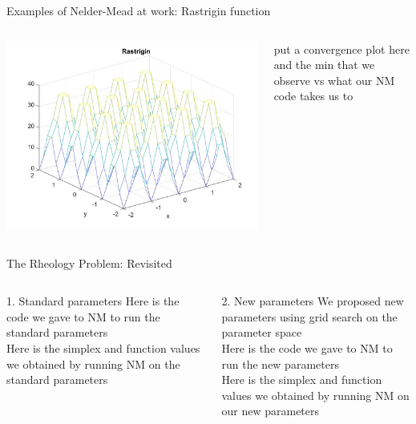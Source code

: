 \documentclass{beamer}
\begin{document}
\begin{frame}{Examples of Nelder-Mead at work: Rastrigin function}
\begin{columns}
\begin{column}{0.4\linewidth}
	\includegraphics[width=0.95\linewidth]{rastriginPlotS1}	
\end{column}
\begin{column}{0.58\linewidth}
	put a convergence plot here and the min that we observe vs what our NM code takes us to
\end{column}
\end{columns}
\end{frame}


\begin{frame}{The Rheology Problem: Revisited}
	\begin{columns}
	\begin{column}{0.49\linewidth}
	\begin{block}{1. Standard parameters}
		Here is the code we gave to NM to run the standard parameters\\
		Here is the simplex and function values we obtained by running NM on the standard parameters
	\end{block}
	\end{column}
	\begin{column}{0.49\linewidth}
	\begin{block}{2. New parameters}
		We proposed new parameters using grid search on the parameter space\\
		Here is the code we gave to NM to run the new parameters\\
		Here is the simplex and function values we obtained by running NM on our new parameters
	\end{block}
	\end{column}
	\end{columns}
\end{frame}
\end{document}
